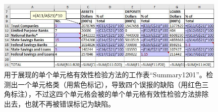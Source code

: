 \begin{figure}[tbp]
    \centering
    \includegraphics[width=\columnwidth]{figure/figure2.png}
    \caption{用于展现\wa 的单个单元格有效性检验方法的工作表``Summary1201''。\cu 检测出一个单元格类（用紫色标记），导致四个误报的缺陷（用红色三角标注），不过这四个单元格会被\wa 的单个单元格有效性检验方法排除出去，也就不再被错误标记为缺陷。}
    \label{figure2}
\end{figure}